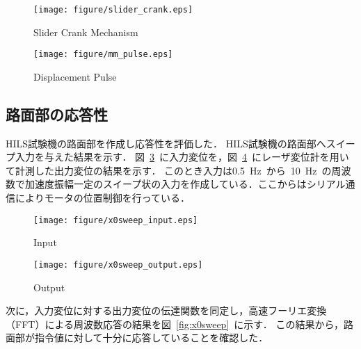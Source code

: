 \documentclass[a4paper,12pt]{article_vdlab_sotsuron}
\begin{document}
\vspace{5mm}
\begin{figure}[h]
  \begin{center}
    \texttt{[image: figure/slider\_crank.eps]}
    \vspace*{3mm}
    \caption{Slider Crank Mechanism}
    \label{fig:slider_crank}
  \end{center}
\end{figure}

\vspace{5mm}
\begin{figure}[h]
\begin{center}
    \texttt{[image: figure/mm\_pulse.eps]}
    \vspace*{3mm}
    \caption{Displacement Pulse}
    \label{fig:mm_to_pulse}
     \end{center}
\end{figure}


\newpage
\subsection{路面部の応答性}
HILS試験機の路面部を作成し応答性を評価した．
HILS試験機の路面部へスイープ入力を与えた結果を示す．
図~\ref{fig:x0sweep_input}~に入力変位を，図~\ref{fig:x0sweep_output}~にレーザ変位計を用いて計測した出力変位の結果を示す．
このとき入力は0.5~Hz~から~10~Hz~の周波数で加速度振幅一定のスイープ状の入力を作成している．ここからはシリアル通信によりモータの位置制御を行っている．

\vspace*{12mm}
\begin{figure}[h]
  \begin{center}
    \texttt{[image: figure/x0sweep\_input.eps]}
    \vspace*{3mm}
    \caption{Input}
    \label{fig:x0sweep_input}
  \end{center}
\end{figure}

\vspace*{12mm}
 \begin{figure}[h]
  \begin{center}
    \texttt{[image: figure/x0sweep\_output.eps]}
    \vspace*{3mm}
    \caption{Output}
    \label{fig:x0sweep_output}
  \end{center}
\end{figure}

\newpage
次に，入力変位に対する出力変位の伝達関数を同定し，高速フーリエ変換（FFT）による周波数応答の結果を図~\ref{fig:x0sweep}~に示す．
この結果から，路面部が指令値に対して十分に応答していることを確認した．
\end{document}
